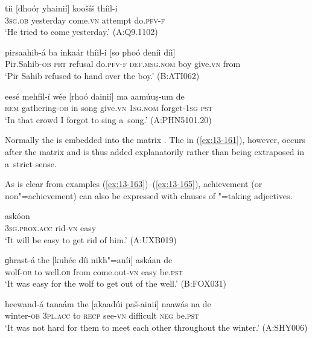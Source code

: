 \begin{exe}
\ex
\label{ex:13-160}
\gll tíi [dhoóṛ yhainií] koošíš thíil-i \\
\textsc{3sg.ob} yesterday come.\textsc{vn} attempt do.\textsc{pfv-f} \\
\glt `He tried to come yesterday.' (A:Q9.1102)

\ex
\label{ex:13-161}
\gll pirsaahib-á ba inkaár thíil-i [so phoó  deníi díi] \\
Pir.Sahib-\textsc{ob} \textsc{prt} refusal do.\textsc{pfv-f} \textsc{def.msg.nom} boy  give.\textsc{vn} from \\
\glt `Pir Sahib refused to hand over the boy.' (B:ATI062)

\ex
\label{ex:13-162}
\gll eesé mehfil-í wée [rhoó dainií] ma  aamúuṣ-um de \\
\textsc{rem} gathering-\textsc{ob} in song give.\textsc{vn} \textsc{1sg.nom} forget-\textsc{1sg} \textsc{pst} \\
\glt `In that crowd I forgot to sing a~song.' (A:PHN5101.20) 
\end{exe}

Normally the   is embedded into the matrix . The  in (\ref{ex:13-161}), however, occurs after the matrix  and is thus added explanatorily rather than being extraposed in a~strict sense.


As is clear from examples (\ref{ex:13-163})--(\ref{ex:13-165}), achievement (or non"=achievement) can also be expressed with  clauses of "=taking adjectives.

\begin{exe}
\ex
\label{ex:13-163}
\gll [nis phus"=ainií] askóon \\
\textsc{3sg.prox.acc} rid-\textsc{vn} easy \\
\glt `It will be easy to get rid of him.' (A:UXB019)

\ex
\label{ex:13-164}
\gll ɡhrast-á the [kuhée díi nikh"=aníi] askáan de  \\
wolf-\textsc{ob} to well.\textsc{ob} from come.out-\textsc{vn} easy be.\textsc{pst}  \\
\glt `It was easy for the wolf to get out of the well.' (B:FOX031)

\ex
\label{ex:13-165}
\gll heewand-á tanaám the [akaadúi paš-ainií] naawás  na de \\
winter-\textsc{ob} \textsc{3pl.acc} to \textsc{recp} see-\textsc{vn} difficult \textsc{neg} be.\textsc{pst} \\
\glt `It was not hard for them to meet each other throughout the winter.' (A:SHY006) 
\end{exe}

